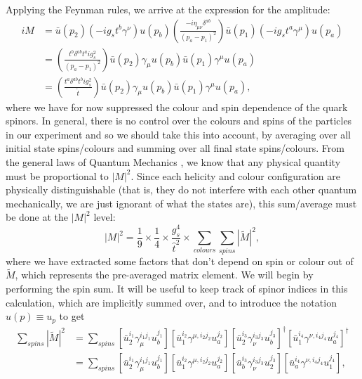 Applying the Feynman rules, we arrive at the expression for the amplitude:
\begin{equation}
\begin{split}
iM &= \bar{u}(p_2) (-i g_s t^b \gamma^\nu)u(p_b) \left(\frac{-i \eta_{\mu \nu} \delta^{ab}}{(p_a-p_1)^2} \right)\bar{u}(p_1)(-i g_s t^a \gamma^\mu) u(p_a) \\
&= \left(\frac{t^b \delta^{ab} t^a i g_s^2 }{(p_a-p_1)^2}\right) \bar{u}(p_2) \gamma_\mu u(p_b) \bar{u}(p_1)\gamma^\mu u(p_a) \\
&= \left(\frac{t^a \delta^{ab} t^b i g_s^2 }{\hat{t}}\right) \bar{u}(p_2) \gamma_\mu u(p_b) \bar{u}(p_1)\gamma^\mu u(p_a),
\end{split}
\end{equation}
where we have for now suppressed the colour and spin dependence of the quark spinors. In general, there is no control over the colours and spins of the particles in our experiment and so we should take this into account, by averaging over all initial state spins/colours and summing over all final state spins/colours. From the general laws of Quantum Mechanics \cite{Dirac}, we know that any physical quantity must be proportional to $|M|^2$. Since each helicity and colour configuration are physically distinguishable (that is, they do not interfere with each other quantum mechanically, we are just ignorant of what the states are), this sum/average must be done at the $|M|^2$ level:
\begin{equation}
|M|^2 = \frac{1}{9} \times \frac{1}{4} \times \frac{g_s^4}{\hat{t}^2} \times \sum_{colours}  \sum_{spins} |\tilde{M}|^2,
\end{equation}
where we have extracted some factors that don't depend on spin or colour out of $\tilde{M}$, which represents the pre-averaged matrix element. We will begin by performing the spin sum. It will be useful to keep track of spinor indices in this calculation, which are implicitly summed over, and to  introduce the notation $u(p) \equiv u_p$ to get 
\begin{equation}
\begin{split}
\sum_{spins}|\tilde{M}|^2 &= \sum_{spins}  [\bar{u}_2^{i_1} \gamma_\mu^{i_1 j_1} u_b^{j_1}][\bar{u}_1^{i_2}\gamma^{\mu, i_2 j_2} u_a^{j_2}] [\bar{u}_2^{i_3}\gamma_\nu^{i_3 j_3} u_b^{j_3}]^\dagger [\bar{u}_1^{i_4}\gamma^{\nu, i_4 j_4} u_a^{j_4}]^\dagger \\
&= \sum_{spins}  [\bar{u}_2^{i_1} \gamma_\mu^{i_1 j_1} u_b^{j_1}][\bar{u}_1^{i_2}\gamma^{\mu, i_2 j_2} u_a^{j_2}] [\bar{u}_b^{i_3} \gamma_\nu^{i_3 j_3}  u_2^{j_3}][\bar{u}_a^{i_4}  \gamma^{\nu, i_4 j_4} u_1^{j_4}],
\end{split}
\end{equation}
